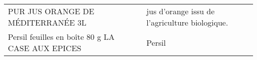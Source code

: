 \begin{longtable}{p{5cm}p{10cm}}
                                                                        PUR JUS ORANGE DE MÉDITERRANÉE 3L &                                                                                                                                                                                                                                                                                                                                                                                                                                                                                                                                                                                                                                                                                                                                                                                                                                                                                                                                                                                           jus d'orange issu de l'agriculture biologique. \\
                                                         Persil feuilles en boîte 80 g LA CASE AUX EPICES &                                                                                                                                                                                                                                                                                                                                                                                                                                                                                                                                                                                                                                                                                                                                                                                                                                                                                                                                                                                                                                   Persil \\

\end{longtable}
